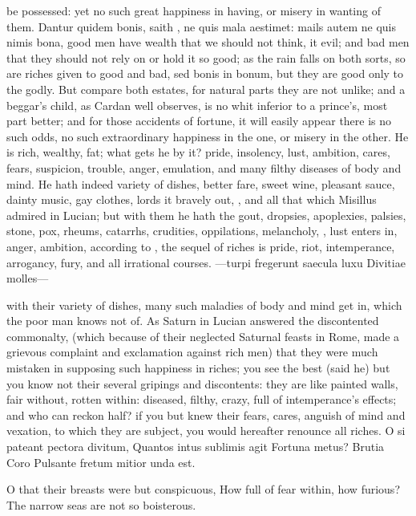 {be possessed: yet no such great happiness in having, or misery in
wanting of them. Dantur quidem bonis, saith \Austin{}, ne quis mala
aestimet: mails autem ne quis nimis bona, good men have wealth that we
should not think, it evil; and bad men that they should not rely on or
hold it so good; as the rain falls on both sorts, so are riches given
to good and bad, sed bonis in bonum, but they are good only to the
godly. But compare both estates, for natural parts they are not
unlike; and a beggar's child, as Cardan well observes, is no whit
inferior to a prince's, most part better; and for those accidents of
fortune, it will easily appear there is no such odds, no such
extraordinary happiness in the one, or misery in the other. He is rich,
wealthy, fat; what gets he by it? pride, insolency, lust, ambition,
cares, fears, suspicion, trouble, anger, emulation, and many filthy
diseases of body and mind. He hath indeed variety of dishes, better
fare, sweet wine, pleasant sauce, dainty music, gay clothes, lords it
bravely out, \etc{}, and all that which Misillus admired in Lucian;
but with them he hath the gout, dropsies, apoplexies, palsies, stone,
pox, rheums, catarrhs, crudities, oppilations, melancholy, \etc{},
lust enters in, anger, ambition, according to \Chrysostom, the
sequel of riches is pride, riot, intemperance, arrogancy, fury, and all
irrational courses.
---turpi fregerunt saecula luxu
Divitiae molles---

with their variety of dishes, many such maladies of body and mind get
in, which the poor man knows not of. As Saturn in Lucian answered
the discontented commonalty, (which because of their neglected Saturnal
feasts in Rome, made a grievous complaint and exclamation against rich
men) that they were much mistaken in supposing such happiness in
riches; you see the best (said he) but you know not their several
gripings and discontents: they are like painted walls, fair without,
rotten within: diseased, filthy, crazy, full of intemperance's effects;
and who can reckon half? if you but knew their fears, cares,
anguish of mind and vexation, to which they are subject, you would
hereafter renounce all riches.
O si pateant pectora divitum,
Quantos intus sublimis agit
Fortuna metus? Brutia Coro
Pulsante fretum mitior unda est.

O that their breasts were but conspicuous,
How full of fear within, how furious?
The narrow seas are not so boisterous.

}
